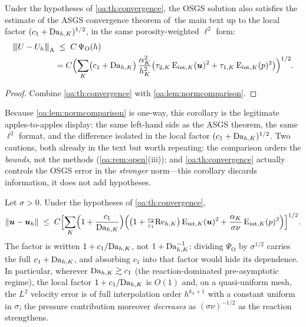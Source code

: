 \begin{corollary}
\label{oa:cor:asgsnorm}
Under the hypotheses of \cref{oa:th:convergence}, the OSGS solution also satisfies the
estimate of the ASGS convergence theorem of~the main text up to the local factor
$(c_1+\mathrm{Da}_{h,K})^{1/2}$, in the same porosity-weighted $\ell^2$ form:
\[
\begin{aligned}
  {\lvert\kern-0.25ex\lvert\kern-0.25ex\lvert U - U_h \rvert\kern-0.25ex\rvert\kern-0.25ex\rvert}_{\mathrm{A}}
  &\;\le\;
  C\,\Psi_{\mathrm O}(h) \\
  &= C\Bigl( \sum_K \bigl( c_1 + \mathrm{Da}_{h,K} \bigr)\,\frac{\alpha_K^2}{h_K^2}
  \bigl( \tau_{2,K}\,\mathrm{E}_{\mathrm{int},K}(\boldsymbol{u})^2 + \tau_{1,K}\,\mathrm{E}_{\mathrm{int},K}(p)^2 \bigr) \Bigr)^{1/2} .
\end{aligned}
\]
\end{corollary}

\begin{proof}
Combine \cref{oa:th:convergence} with \cref{oa:lem:normcomparison}.
\end{proof}

\begin{pedagogy}
Because \cref{oa:lem:normcomparison} is one-way, this corollary is the
legitimate apples-to-apples display: the same left-hand side as the ASGS
theorem, the same $\ell^2$ format, and the difference isolated in the local
factor $(c_1+\mathrm{Da}_{h,K})^{1/2}$. Two cautions, both already in the text but worth
repeating: the comparison orders the \emph{bounds}, not the methods
(\cref{oa:rem:open}(iii)); and \cref{oa:th:convergence} actually controls the
OSGS error in the \emph{stronger} norm---this corollary discards information,
it does not add hypotheses.
\end{pedagogy}

\begin{corollary}
\label{oa:cor:Ltwo}
Let $\sigma > 0$. Under the hypotheses of \cref{oa:th:convergence},
\begin{equation}
  \label{oa:eq:LtwoVelocity}
  \lVert \boldsymbol{u} - \boldsymbol{u}_h \rVert
  \;\le\;
  C \Bigl[ \sum_K \Bigl( 1 + \frac{c_1}{\mathrm{Da}_{h,K}} \Bigr)
  \Bigl(
  \bigl( 1 + \tfrac{c_2}{c_1}\mathrm{Re}_{h,K} \bigr)\, \mathrm{E}_{\mathrm{int},K}(\boldsymbol{u})^2
  + \frac{\alpha_K}{\sigma\nu}\, \mathrm{E}_{\mathrm{int},K}(p)^2
  \Bigr) \Bigr]^{1/2}.
\end{equation}
The factor is written $1+c_1/\mathrm{Da}_{h,K}$, not $1+\mathrm{Da}_{h,K}^{-1}$: dividing $\Psi_{\mathrm O}$ by
$\sigma^{1/2}$ carries the full $c_1+\mathrm{Da}_{h,K}$, and absorbing $c_1$ into that factor would hide
its dependence. In particular, wherever $\mathrm{Da}_{h,K} \gtrsim c_1$ (the reaction-dominated
pre-asymptotic regime), the local factor $1+c_1/\mathrm{Da}_{h,K}$ is $O(1)$ and, on a quasi-uniform
mesh, the $L^2$ velocity error is of full interpolation order $h^{k_u+1}$ with a constant
uniform in $\sigma$; the pressure contribution moreover \emph{decreases} as
$(\sigma\nu)^{-1/2}$ as the reaction strengthens.
\end{corollary}

